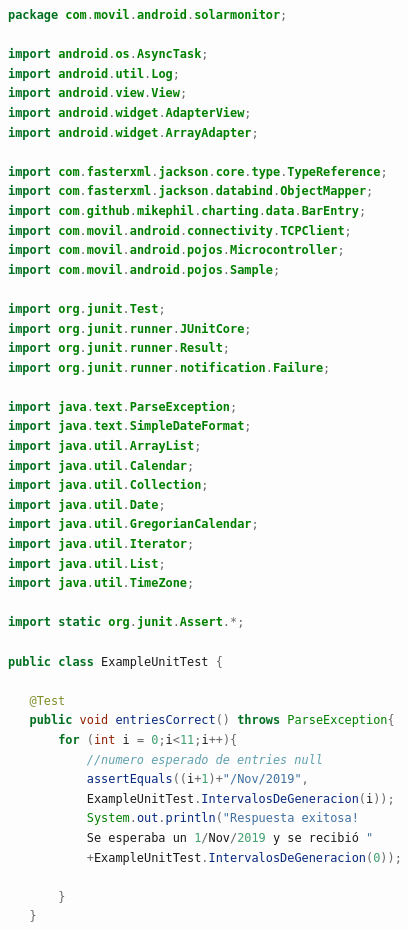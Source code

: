 \begin{lstlisting}[language= Java, frame=single]
package com.movil.android.solarmonitor;

import android.os.AsyncTask;
import android.util.Log;
import android.view.View;
import android.widget.AdapterView;
import android.widget.ArrayAdapter;

import com.fasterxml.jackson.core.type.TypeReference;
import com.fasterxml.jackson.databind.ObjectMapper;
import com.github.mikephil.charting.data.BarEntry;
import com.movil.android.connectivity.TCPClient;
import com.movil.android.pojos.Microcontroller;
import com.movil.android.pojos.Sample;

import org.junit.Test;
import org.junit.runner.JUnitCore;
import org.junit.runner.Result;
import org.junit.runner.notification.Failure;

import java.text.ParseException;
import java.text.SimpleDateFormat;
import java.util.ArrayList;
import java.util.Calendar;
import java.util.Collection;
import java.util.Date;
import java.util.GregorianCalendar;
import java.util.Iterator;
import java.util.List;
import java.util.TimeZone;

import static org.junit.Assert.*;

public class ExampleUnitTest {

   @Test
   public void entriesCorrect() throws ParseException{
       for (int i = 0;i<11;i++){
           //numero esperado de entries null
           assertEquals((i+1)+"/Nov/2019", 
           ExampleUnitTest.IntervalosDeGeneracion(i));
           System.out.println("Respuesta exitosa! 
           Se esperaba un 1/Nov/2019 y se recibió "
           +ExampleUnitTest.IntervalosDeGeneracion(0));

       }
   }


\end{lstlisting}
